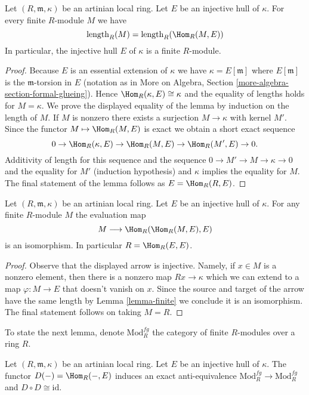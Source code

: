 \begin{lemma}
\label{lemma-finite}
Let $(R, \mathfrak m, \kappa)$ be an artinian local ring.
Let $E$ be an injective hull of $\kappa$. For every finite
$R$-module $M$ we have
$$
\text{length}_R(M) = \text{length}_R(\Hom_R(M, E))
$$
In particular, the injective hull $E$ of $\kappa$ is a finite $R$-module.
\end{lemma}

\begin{proof}
Because $E$ is an essential extension of $\kappa$ we have
$\kappa = E[\mathfrak m]$ where $E[\mathfrak m]$ is the
$\mathfrak m$-torsion in $E$ (notation as in More on Algebra, Section
\ref{more-algebra-section-formal-glueing}).
Hence $\Hom_R(\kappa, E) \cong \kappa$ and the equality of lengths
holds for $M = \kappa$. We prove the displayed equality of the lemma
by induction on the length of $M$. If $M$ is nonzero there exists a surjection
$M \to \kappa$ with kernel $M'$. Since the functor $M \mapsto \Hom_R(M, E)$
is exact we obtain a short exact sequence
$$
0 \to \Hom_R(\kappa, E) \to \Hom_R(M, E) \to \Hom_R(M', E) \to 0.
$$
Additivity of length for this sequence and the sequence
$0 \to M' \to M \to \kappa \to 0$ and the equality for $M'$ (induction
hypothesis) and $\kappa$ implies the equality for $M$.
The final statement of the lemma follows as $E = \Hom_R(R, E)$.
\end{proof}

\begin{lemma}
\label{lemma-evaluate}
Let $(R, \mathfrak m, \kappa)$ be an artinian local ring.
Let $E$ be an injective hull of $\kappa$.
For any finite $R$-module $M$ the evaluation map
$$
M \longrightarrow \Hom_R(\Hom_R(M, E), E)
$$
is an isomorphism. In particular $R = \Hom_R(E, E)$.
\end{lemma}

\begin{proof}
Observe that the displayed arrow is injective. Namely, if $x \in M$ is
a nonzero element, then there is a nonzero map $Rx \to \kappa$ which
we can extend to a map $\varphi : M \to E$ that doesn't vanish on $x$.
Since the source and target of the arrow have the same length by
Lemma \ref{lemma-finite}
we conclude it is an isomorphism. The final statement follows
on taking $M = R$.
\end{proof}

\noindent
To state the next lemma, denote $\text{Mod}^{fg}_R$ the category of finite
$R$-modules over a ring $R$.

\begin{lemma}
\label{lemma-duality}
Let $(R, \mathfrak m, \kappa)$ be an artinian local ring.
Let $E$ be an injective hull of $\kappa$.
The functor $D(-) = \Hom_R(-, E)$ induces an exact anti-equivalence
$\text{Mod}^{fg}_R \to \text{Mod}^{fg}_R$ and
$D \circ D \cong \text{id}$.
\end{lemma}

